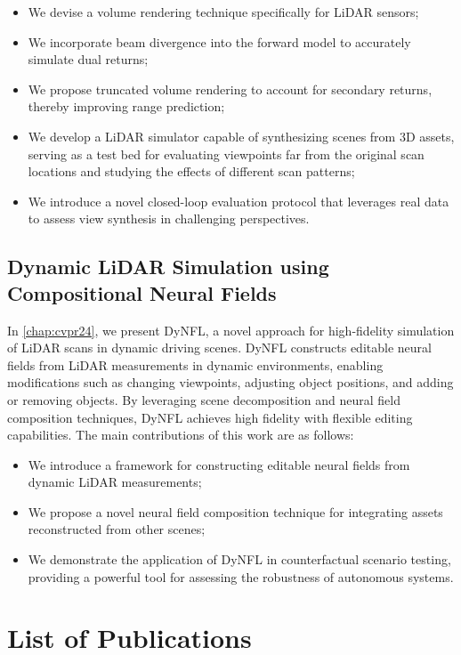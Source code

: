 \begin{itemize}
\item We devise a volume rendering technique specifically for LiDAR sensors;
\item We incorporate beam divergence into the forward model to accurately simulate dual returns;
\item We propose truncated volume rendering to account for secondary returns, thereby improving range prediction;
\item We develop a LiDAR simulator capable of synthesizing scenes from 3D assets, serving as a test bed for evaluating viewpoints far from the original scan locations and studying the effects of different scan patterns;
\item We introduce a novel closed-loop evaluation protocol that leverages real data to assess view synthesis in challenging perspectives.
\end{itemize}


\subsection{Dynamic LiDAR Simulation using Compositional Neural Fields}
In \cref{chap:cvpr24}, we present DyNFL, a novel approach for high-fidelity simulation of LiDAR scans in dynamic driving scenes. DyNFL constructs editable neural fields from LiDAR measurements in dynamic environments, enabling modifications such as changing viewpoints, adjusting object positions, and adding or removing objects. By leveraging scene decomposition and neural field composition techniques, DyNFL achieves high fidelity with flexible editing capabilities. The main contributions of this work are as follows:

\begin{itemize}
\item We introduce a framework for constructing editable neural fields from dynamic LiDAR measurements;
\item We propose a novel neural field composition technique for integrating assets reconstructed from other scenes;
\item We demonstrate the application of DyNFL in counterfactual scenario testing, providing a powerful tool for assessing the robustness of autonomous systems.
\end{itemize}

\section{List of Publications}

